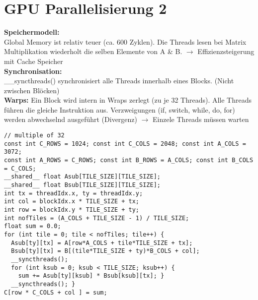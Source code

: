 
\section{GPU Parallelisierung 2}
\textcolor{b}{\textbf{Speichermodell:}}\\
Global Memory ist relativ teuer (ca. 600 Zyklen). Die Threads lesen bei Matrix Multiplikation wiederholt die selben Elemente von A \& B. $\rightarrow$ Effizienzsteigerung mit Cache Speicher\\
\textcolor{b}{\textbf{Synchronisation:}}\\
\textcolor{b}{\_\_syncthreads()} synchronisiert alle Threads innerhalb eines Blocks. (Nicht zwischen Blöcken)\\
\textcolor{b}{\textbf{Warps:}} Ein Block wird intern in Wraps zerlegt (zu je 32 Threads). Alle Threads führen die gleiche Instruktion aus. Verzweigungen (if, switch, while, do, for) werden abwechselnd ausgeführt (Divergenz) $\rightarrow$ Einzele Threads müssen warten
\begin{lstlisting}
// multiple of 32
const int C_ROWS = 1024; const int C_COLS = 2048; const int A_COLS = 3072;
const int A_ROWS = C_ROWS; const int B_ROWS = A_COLS; const int B_COLS = C_COLS;
__shared__ float Asub[TILE_SIZE][TILE_SIZE];
__shared__ float Bsub[TILE_SIZE][TILE_SIZE];
int tx = threadIdx.x, ty = threadIdx.y;
int col = blockIdx.x * TILE_SIZE + tx;
int row = blockIdx.y * TILE_SIZE + ty;
int nofTiles = (A_COLS + TILE_SIZE - 1) / TILE_SIZE;
float sum = 0.0;
for (int tile = 0; tile < nofTiles; tile++) {
  Asub[ty][tx] = A[row*A_COLS + tile*TILE_SIZE + tx];
  Bsub[ty][tx] = B[(tile*TILE_SIZE + ty)*B_COLS + col];
  __syncthreads();
  for (int ksub = 0; ksub < TILE_SIZE; ksub++) {
    sum += Asub[ty][ksub] * Bsub[ksub][tx]; }
  __syncthreads(); }
C[row * C_COLS + col ] = sum;
\end{lstlisting}